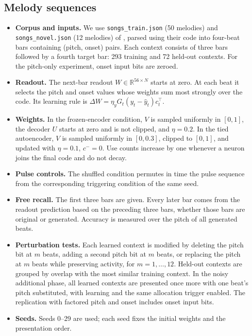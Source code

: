 \documentclass[11pt,a4paper]{article}
\begin{document}
\subsection{Melody sequences}
\begin{itemize}
\item \textbf{Corpus and inputs.} We use \texttt{songs\_train.json} (50 melodies) and \texttt{songs\_novel.json} (12 melodies) of \citet{pena2026songs}, parsed using their code into four-beat bars containing (pitch, onset) pairs. Each context consists of three bars followed by a fourth target bar: 293 training and 72 held-out contexts. For the pitch-only experiment, onset input bits are zeroed.
\item \textbf{Readout.} The next-bar readout $W\in\mathbb R^{56\times N}$ starts at zero. At each beat it selects the pitch and onset values whose weights sum most strongly over the code. Its learning rule is $\Delta W=\eta_yG_t(y_t-\hat y_t)c_t^\top$.
\item \textbf{Weights.} In the frozen-encoder condition, $V$ is sampled uniformly in $[0,1]$, the decoder $U$ starts at zero and is not clipped, and $\eta=0.2$. In the tied autoencoder, $V$ is sampled uniformly in $[0,0.3]$, clipped to $[0,1]$, and updated with $\eta=0.1$, $c^-=0$. Use counts increase by one whenever a neuron joins the final code and do not decay.
\item \textbf{Pulse controls.} The shuffled condition permutes in time the pulse sequence from the corresponding triggering condition of the same seed.
\item \textbf{Free recall.} The first three bars are given. Every later bar comes from the readout prediction based on the preceding three bars, whether those bars are original or generated. Accuracy is measured over the pitch of all generated beats.
\item \textbf{Perturbation tests.} Each learned context is modified by deleting the pitch bit at $m$ beats, adding a second pitch bit at $m$ beats, or replacing the pitch at $m$ beats while preserving activity, for $m=1,\dots,12$. Held-out contexts are grouped by overlap with the most similar training context. In the noisy additional phase, all learned contexts are presented once more with one beat's pitch substituted, with learning and the same allocation trigger enabled. The replication with factored pitch and onset includes onset input bits.
\item \textbf{Seeds.} Seeds 0--29 are used; each seed fixes the initial weights and the presentation order.
\end{itemize}
\end{document}
